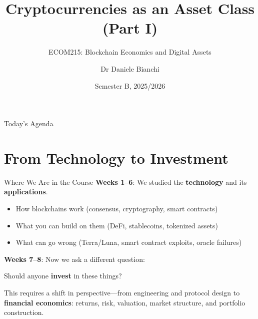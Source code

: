 \documentclass[10pt]{beamer}
\title{Cryptocurrencies as an Asset Class (Part I)}
\subtitle{ECOM215: Blockchain Economics and Digital Assets}
\author{Dr Daniele Bianchi}
\institute{Queen Mary, University of London}
\date{Semester B, 2025/2026}
\newcommand{\highlight}[1]{\textcolor{AccentOrange}{\textbf{#1}}}
\begin{document}
\AtBeginSection[]{
  \begin{frame}[plain]
    \vfill
    \begin{center}
      {\Large\color{ImperialBlue}\insertsection}
    \end{center}
    \vfill
  \end{frame}
}

\begin{frame}[plain]
  \titlepage
\end{frame}

\begin{frame}{Today's Agenda}
  \tableofcontents
\end{frame}

\section{From Technology to Investment}

\begin{frame}{Where We Are in the Course}
  \textbf{Weeks 1--6}: We studied the \highlight{technology} and its \highlight{applications}.
  \begin{itemize}
    \item How blockchains work (consensus, cryptography, smart contracts)
    \item What you can build on them (DeFi, stablecoins, tokenized assets)
    \item What can go wrong (Terra/Luna, smart contract exploits, oracle failures)
  \end{itemize}
  
  \vspace{1em}
  \textbf{Weeks 7--8}: Now we ask a different question:
  
  \vspace{0.5em}
  \begin{center}
    \Large Should anyone \highlight{invest} in these things?
  \end{center}
  
  \vspace{1em}
  This requires a shift in perspective---from engineering and protocol design to \textbf{financial economics}: returns, risk, valuation, market structure, and portfolio construction.
\end{frame}
\end{document}
